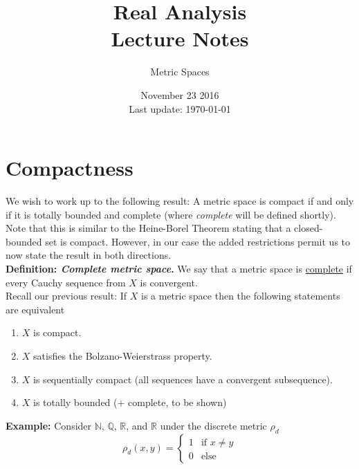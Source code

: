 \documentclass[12pt]{article}
\newlength\tindent
\renewcommand{\indent}{\hspace*{\tindent}}
\newcommand{\R}{\mathbb R}
\newcommand{\N}{\mathbb N}
\newcommand{\Q}{\mathbb Q}
\begin{document}
 
 
\title{Real Analysis\\Lecture Notes}
\author{Metric Spaces}
\date{November 23 2016 \\ Last update: \today{}}
\maketitle

\section{Compactness}

\indent We wish to work up to the following result: A metric space is compact if and only if it is totally bounded and complete (where {\em complete} will be defined shortly). Note that this is similar to the Heine-Borel Theorem stating that a closed-bounded set is compact. However, in our case the added restrictions permit us to now state the result in both directions. \\

%
%
{\bf Definition: {\em Complete metric space}.} We say that a metric space is \underline{complete} if every Cauchy sequence from $X$ is convergent. \\

Recall our previous result: If $X$ is a metric space then the following statements are equivalent
\begin{enumerate}
	\item $X$ is compact.
	\item $X$ satisfies the Bolzano-Weierstrass property.
	\item $X$ is sequentially compact (all sequences have a convergent subsequence). 
	\item $X$ is totally bounded (+ complete, to be shown)
\end{enumerate}

%
%
{\bf Example:} Consider $\N$, $\Q$, $\R$, and $\R$ under the discrete metric $\rho_d$
\begin{equation*}
	\rho_d(x,y) = 
	\begin{cases}
		1 & \text{if $x \neq y$} \\
		0 & \text{else}
	\end{cases}
\end{equation*}
\end{document}
